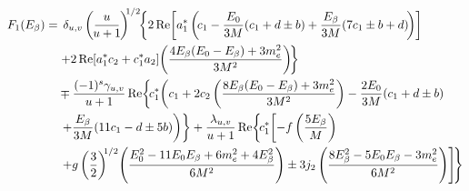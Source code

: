 %
%
%
\begin{align}
F_1(\Ee) = & \:\:
\deltauv \left( \frac{u}{\!u+1\!} \right)^{\!\!1/2} \!\!
\left\{
	2 \Re\left[ 
		a_1^*\left(\! c_1 - \frac{E_0}{3M}(c_1 + d \pm b) + \frac{\Ee}{3M}( 7 c_1 \pm b + d )\! \right)
	\right]
	\right. \nonumber \\ & \left. 
	+
	2 \Re\left[
		a_1^* c_2 + c_1^* a_2
	\right] \!
	\left(
		\frac{4 \E(E_0 - \E) + 3 \me^2}{3M^2}
	\right) \!
\right\}
\nonumber \\ &
\mp \frac{ (-1)^s \gammauv}{u+1} 
\Re \left\{ \!
	c_1^* \! \left(
		c_1 + 2 c_2 \left(\frac{8\Ee(E_0-\Ee)+3\me^2}{3M^2}\right)
		- \frac{2 E_0}{3 M} (c_1 + d \pm b) 
		\right.\right. \nonumber \\ & \left.\left.
		+ \frac{\Ee}{3M} (11 c_1 - d \pm 5 b)
	\right)
\right\}
+ 
\frac{\lambdauv}{u+1}
\Re \left\{ \!
	c_1^* \! \left[
		- f \left(\frac{5\Ee}{M}\right)
		\right. \right. \nonumber \\ & \left. \left.
		+ g \left( \frac{3}{2} \right)^{\!\!1/2} \!
		\left(
			\frac{E_0^2 - 11 E_0 \Ee + 6 \me^2 + 4\Ee^2 }{6M^2}
		\right) 
		\pm 3 j_2 
		\left(
			\frac{8 \Ee^2 - 5E_0 \Ee - 3 \me^2}{6M^2}
		\right)
	\right] \!
\right\}
\end{align}
%